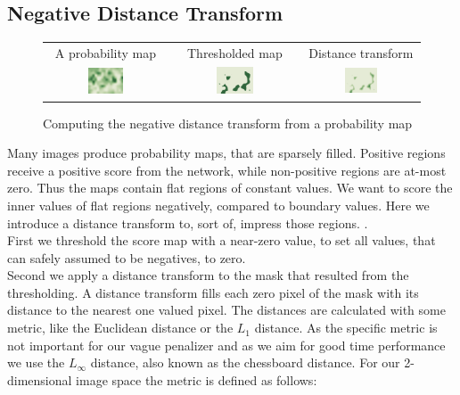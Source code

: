 \subsection{Negative Distance Transform}
\label{sec:pipeline:eval:dt}
\begin{figure}[htb]
    \begin{tabular}{ccc}
        A probability map & Thresholded map & Distance transform \\[3pt]
        \includegraphics[width=0.303\textwidth]{figures/distance_transform_hm} &
        \includegraphics[width=0.303\textwidth]{figures/distance_transform_thres} &
        \includegraphics[width=0.303\textwidth]{figures/distance_transform_negative}
    \end{tabular}
	\caption{Computing the negative distance transform from a probability map}
    \label{fig:distance_transform}
\end{figure}
Many images produce probability maps, that are sparsely filled. Positive regions receive a positive score from the network, while non-positive regions are at-most zero. Thus the maps contain flat regions of constant values. We want to score the inner values of flat regions negatively, compared to boundary values. Here we introduce a distance transform to, sort of, impress those regions. .\\
First we threshold the score map with a near-zero value, to set all values, that can safely assumed to be negatives, to zero.\\
Second we apply a distance transform to the mask that resulted from the thresholding. A distance transform fills each zero pixel of the mask with its distance to the nearest one valued pixel. The distances are calculated with some metric, like the Euclidean distance or the $L_1$ distance. As the specific metric is not important for our vague penalizer and as we aim for good time performance we use the $L_\infty$ distance, also known as the chessboard distance. For our 2-dimensional image space the metric is defined as follows:
